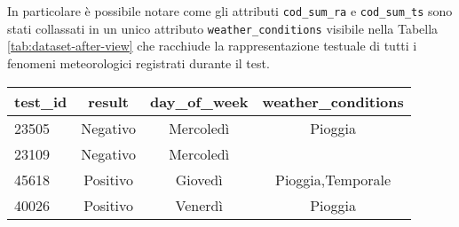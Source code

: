 \begin{itemize}
	In particolare è possibile notare come gli attributi \texttt{cod\_sum\_ra} e 
	\texttt{cod\_sum\_ts} sono stati collassati in un unico attributo 
	\texttt{weather\_conditions} visibile nella Tabella 
	\ref{tab:dataset-after-view} che racchiude la rappresentazione testuale di 
	tutti i fenomeni meteorologici registrati durante il test.

	\vspace{.5em}
	\begin{centering}
		\begin{tabular}{lccc}
			\toprule
			test\_id & result & day\_of\_week & weather\_conditions \\
			\midrule
			23505 & Negativo & Mercoledì & {Pioggia} \\
			23109 &	Negativo & Mercoledì & {} \\
			45618 &	Positivo & Giovedì & {Pioggia,Temporale} \\
			40026 &	Positivo & Venerdì & {Pioggia} \\
			\bottomrule
		\end{tabular}
		\label{tab:dataset-after-view}
	\end{centering}

\end{itemize}

